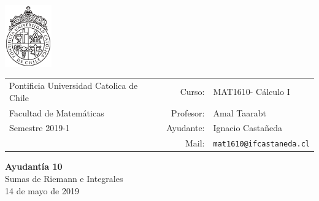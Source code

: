 \documentclass[12pt]{article}
\makeatletter
\newcommand{\ayudantia}{{\sc Ayudantía 10}}
\newcommand{\tituloayu}{Sumas de Riemann e Integrales}
\newcommand{\fecha}{14 de mayo de 2019}
\newcommand{\sigla}{MAT1610}
\newcommand{\nombre}{Cálculo I}
\newcommand{\profesor}{Amal Taarabt}
\newcommand{\ano}{2019}
\newcommand{\semestre}{1}
\newcommand{\mail}{mat1610@ifcastaneda.cl}
\makeatother
\begin{document}
\thispagestyle{empty}

\begin{minipage}{2cm}
	\includegraphics[width=2cm]{../../../../img/logo.pdf}
	\vspace{0.5cm}
\end{minipage}
\begin{minipage}{\linewidth}
	\begin{tabular}{lrl}
		{\scriptsize\sc Pontificia Universidad Catolica de Chile} & \hspace*{0.7in}Curso: &
		\sigla  - \nombre\\
		{\sc Facultad de Matemáticas}&
		Profesor: & \profesor \\
		{\sc Semestre \ano-\semestre} & Ayudante: & {Ignacio Castañeda}\\
		& {Mail:} & \texttt{\mail}
	\end{tabular}
\end{minipage}

\vspace{-10mm}
\begin{center}
	{\LARGE\bf \ayudantia}\\
	\vspace{0.1cm}
	{\tituloayu}\\
	\vspace{0.1cm}
	\fecha\\
	\vspace{0.4cm}
\end{center}
\end{document}
